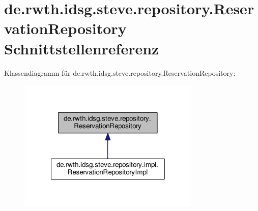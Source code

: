 \hypertarget{interfacede_1_1rwth_1_1idsg_1_1steve_1_1repository_1_1_reservation_repository}{\section{de.\-rwth.\-idsg.\-steve.\-repository.\-Reservation\-Repository Schnittstellenreferenz}
\label{interfacede_1_1rwth_1_1idsg_1_1steve_1_1repository_1_1_reservation_repository}
}


Klassendiagramm für de.\-rwth.\-idsg.\-steve.\-repository.\-Reservation\-Repository\-:\nopagebreak
\begin{figure}[H]
\begin{center}
\leavevmode
\includegraphics[width=246pt]{interfacede_1_1rwth_1_1idsg_1_1steve_1_1repository_1_1_reservation_repository__inherit__graph}
\end{center}
\end{figure}
